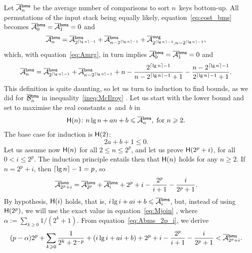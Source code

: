 Let \(\OM{\fun{bms}}{n}\) be the average number of comparisons to sort
\(n\)~keys bottom\hyp{}up. All permutations of the input stack being
equally likely, equation~\eqref{eq:cost_bms} 
becomes \(\OM{\fun{bms}}{0} = \OM{\fun{bms}}{1} = 0\) and
\begin{equation*}
\OM{\fun{bms}}{n} = \OM{\fun{bms}}{2^{\ceiling{\lg n}-1}}
+ \OM{\fun{bms}}{n - 2^{\ceiling{\lg n}-1}}
+ \OM{\fun{mrg}}{2^{\ceiling{\lg n}-1},n - 2^{\ceiling{\lg n}-1}},
\end{equation*}
which, with equation~\eqref{eq:Amrg}, in turn implies
\(\OM{\fun{bms}}{0} = \OM{\fun{bms}}{1} = 0\) and
\begin{equation*}
\OM{\fun{bms}}{n} = \OM{\fun{bms}}{2^{\ceiling{\lg n}-1}}
+ \OM{\fun{bms}}{n - 2^{\ceiling{\lg n}-1}}
+ n - \frac{2^{\ceiling{\lg n}-1}}{n - 2^{\ceiling{\lg n}-1} + 1}
- \frac{n - 2^{\ceiling{\lg n}-1}}{2^{\ceiling{\lg n}-1}+1}.
\end{equation*}
This definition is quite daunting, so let us turn to induction to find
bounds, as we did for \(\OB{\fun{tms}}{n}\) in
inequality~\eqref{ineq:McIlroy} . Let us start
with the lower bound and set to maximise the real constants
\(a\)~and~\(b\) in
\begin{equation*}
\pred{H}{n} \colon n\lg n + an + b \leqslant \OM{\fun{bms}}{n},
\; \text{for \(n \geqslant 2\).}
\end{equation*}
The base case for induction is \(\textsf{H}({2})\):
\begin{equation}
2a + b + 1 \leqslant 0.
\label{ineq:base_lower_Btms}
\end{equation}
Let us assume now \(\textsf{H}({n})\) for all \(2 \leqslant n \leqslant
2^p\), and let us prove \(\textsf{H}({2^p+i})\), for all \(0 < i \leqslant
2^p\). The induction principle entails then that \(\textsf{H}({n})\)
holds for any \(n \geqslant 2\). If \(n=2^p+i\), then \(\lceil{\lg
  n}\rceil - 1 = p\), so
\begin{equation}
\OM{\fun{bms}}{2^p+i} = \OM{\fun{bms}}{2^p} + \OM{\fun{bms}}{i}
+ 2^p + i - \frac{2^p}{i+1} - \frac{i}{2^p+1}.
\label{eq:Abms_2p_i}
\end{equation}
By hypothesis, \(\textsf{H}({i})\) holds, that is, \(i\lg i + ai + b
\leqslant \OM{\fun{bms}}{i}\), but, instead of using
\(\textsf{H}({2^p})\), we will use the exact value in
equation~\eqref{eq:Mjoin} , where \(\alpha :=
\sum_{k \geqslant 0}1/(2^k+1)\). From equation~\eqref{eq:Abms_2p_i},
we derive
\begin{equation*}
(p-\alpha)2^p + \sum_{k \geqslant
    0}\frac{1}{2^{k}+2^{-p}}
+ (i\lg i + ai + b) + 2^p + i -
\frac{2^p}{i+1} - \frac{i}{2^p+1} < \OM{\fun{bms}}{2^p+i}.
\end{equation*}
